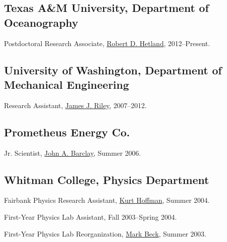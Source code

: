 \documentclass[10pt,letterpaper]{article}
\renewenvironment{itemize}{
  \begin{list}{}{
    \setlength{\leftmargin}{1.5em}
    \setlength{\itemsep}{0.25em}
    \setlength{\parskip}{0pt}
    \setlength{\parsep}{0.25em}
  }
}{
  \end{list}
}
\begin{document}
\subsection*{Texas A\&M University, Department of Oceanography}

\begin{itemize}

\item Postdoctoral Research Associate, \href{http://pong.tamu.edu/~rob/}{Robert D. Hetland}, 2012--Present.

\end{itemize}

\subsection*{University of Washington, Department of Mechanical Engineering}

\begin{itemize}

\item Research Assistant,
  \href{http://faculty.washington.edu/rileyj/}{James J. Riley},
 2007--2012.


\end{itemize}

\subsection*{Prometheus Energy Co.}

\begin{itemize}

\item Jr. Scientist,
  \href{http://www.prometheus-energy.com/aboutus/team.php}{John A. Barclay},
  Summer 2006.

\end{itemize}

\subsection*{Whitman College,
  Physics Department}

\begin{itemize}

\item Fairbank Physics Research Assistant,
  \href{http://people.whitman.edu/~hoffman/}{Kurt Hoffman},
  Summer 2004.

\item First-Year Physics Lab Assistant,  Fall 2003--Spring 2004.

\item First-Year Physics Lab Reorganization, 
 \href{http://people.whitman.edu/~beckmk/}{Mark Beck},
 Summer 2003.

\end{itemize}
\end{document}
